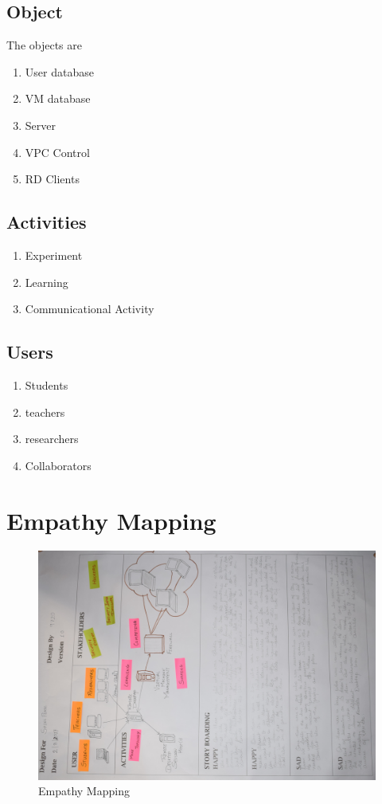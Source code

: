 \documentclass[12pt,a4paper,final,oneside]{report}
\begin{document}
\subsection{Object}
\textbf{}
The objects are 
\begin{enumerate}
\item User database
\item VM database
\item Server
\item VPC Control
\item RD Clients
\end{enumerate} 
\subsection{Activities}
\textbf{}
\begin{enumerate}
\item Experiment
\item Learning
\item Communicational Activity
\end{enumerate}
\subsection{Users}
\textbf{}
\begin{enumerate}
\item Students
\item teachers
\item researchers
\item Collaborators
\end{enumerate}
\newpage
	\section{Empathy Mapping} 
	\noindent\begin{figure}[h!]
		\centering
		\includegraphics[width=1.0\linewidth,angle=0]{empathy.jpg}
		\caption{Empathy Mapping }
	\end{figure}
\end{document}
